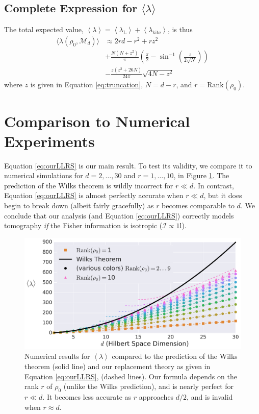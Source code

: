 \documentclass[aps,pra, twocolumn]{revtex4-1}
\newcommand{\M}{\mathcal{M}}
\newcommand{\Id}{\mathbb{I}}
\newcommand{\expect}[1]{\ensuremath{\left\langle#1\right\rangle}}
\def\Id{1\!\mathrm{l}}
\newcommand{\Fi}{\mathcal{I}}
\begin{document}
\subsection{Complete Expression for $\langle \lambda \rangle$}
\label{subsec:LLRS}
The total expected value, $\expect{\lambda} = \expect{\lambda_{\mathrm{L}}} + \expect{\lambda_{\mathrm{kite}}}$, is thus
\begin{align}
\label{eq:ourLLRS}
\nonumber \langle \lambda(\rho_{0}, \M_{d}) \rangle &\approx 2rd - r^{2}+rz^{2}\\
\nonumber & + \frac{N(N+z^{2})}{\pi}\left(\frac{\pi}{2} - \sin^{-1}\left(\frac{z}{2\sqrt{N}}\right)\right) \\
& - \frac{z(z^{2}+26N)}{24\pi}\sqrt{4N-z^{2}}
\end{align}
where $z$ is given in Equation \eqref{eq:truncation}, $N=d-r$, and $r = \mathrm{Rank}(\rho_{0})$.

\section{Comparison to Numerical Experiments}
\label{sec:theorycomparison}

Equation \eqref{eq:ourLLRS} is our main result.  To test its validity, we compare it to numerical simulations for $d=2,\ldots,30$ and $r=1,\ldots,10$, in Figure \ref{fig:modelcomp-iso}.  The prediction of the Wilks theorem is wildly incorrect for $r\ll d$. In contrast, Equation \eqref{eq:ourLLRS} is almost perfectly accurate when $r \ll d$, but it does begin to break down (albeit fairly gracefully) as $r$ becomes comparable to $d$.  We conclude that our analysis (and Equation \eqref{eq:ourLLRS}) correctly models tomography \emph{if} the Fisher information is isotropic ($\Fi \propto \Id$).

\begin{figure}[h]
 \includegraphics[width=\columnwidth]{Images/Figure_6.pdf}
 \caption{Numerical results for $\expect{\lambda}$ compared to the prediction of the Wilks theorem (solid line) and our replacement theory as given in Equation \eqref{eq:ourLLRS}, (dashed lines).  Our formula depends on the rank $r$ of $\rho_0$ (unlike the Wilks prediction), and is nearly perfect for $r\ll d$.  It becomes less accurate as $r$ approaches $d/2$, and is invalid when $r\approx d$.}
 \label{fig:modelcomp-iso}
\end{figure}
\end{document}
